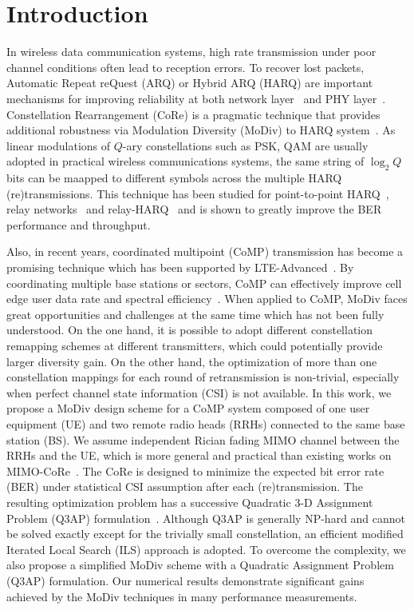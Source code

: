 \documentclass[journal,draftcls,onecolumn,12pt,twoside]{IEEEtran}
\begin{document}
\section{Introduction}
\label{sec:intro}

In wireless data communication systems, high rate transmission under poor
channel conditions often lead to reception errors. To recover lost packets,
Automatic Repeat reQuest (ARQ) or Hybrid ARQ (HARQ) are important mechanisms for
improving reliability at both network layer~\cite{TS36.331} and PHY
layer~\cite{TS36.213}. Constellation Rearrangement (CoRe) is a pragmatic
technique that provides additional robustness via Modulation Diversity (MoDiv)
to HARQ system~\cite{benelli1992new}.
As linear modulations of $Q$-ary constellations such as PSK, QAM are usually
adopted in practical wireless communications systems, the same string of
$\log_2Q$ bits can be maapped to different symbols across the multiple HARQ
(re)transmissions. This technique has been studied for point-to-point
HARQ~\cite{harvind2005symbol}, relay
networks~\cite{seddik2008trans, khormuji2008rate} and
relay-HARQ~\cite{kim2009design, ryu2011ber, wu2016modulation} and is shown to
greatly improve the BER performance and throughput.

Also, in recent years, coordinated multipoint (CoMP) transmission has become a
promising technique which has been supported by
LTE-Advanced~\cite{sawahashi2010coordinated}. By coordinating multiple base
stations or sectors, CoMP can effectively improve cell edge user data rate and
spectral efficiency~\cite{irmer2011coordinated}. When applied to CoMP, MoDiv
faces great opportunities and challenges at the same time which has not been fully
understood. On the one hand,
it is possible to adopt different constellation remapping schemes at different
transmitters, which could potentially provide larger diversity gain. On the
other hand, the optimization of more than one constellation mappings for each
round of retransmission is non-trivial, especially when perfect channel state
information (CSI) is not available.
In this work, we propose a MoDiv design scheme for a CoMP system composed of one
user equipment (UE) and two remote radio heads (RRHs) connected to the same
base station (BS). We assume independent Rician fading MIMO
channel between the RRHs and the UE, which is more general and practical than
existing works on MIMO-CoRe~\cite{bahadori2014performance, zhao2009harq}.
The CoRe is designed to minimize the expected bit error rate (BER) under
statistical CSI assumption after each (re)transmission. The resulting
optimization problem has a successive Quadratic 3-D Assignment Problem (Q3AP)
formulation~\cite{hahn2008quadratic}. Although Q3AP is generally NP-hard and
cannot be solved exactly except for the trivially small constellation, an
efficient modified Iterated Local Search (ILS) approach is adopted. To overcome
the complexity, we also propose a simplified MoDiv scheme with a Quadratic
Assignment Problem (Q3AP) formulation. Our numerical results demonstrate
significant gains achieved by the MoDiv techniques in many performance
measurements.
\end{document}
